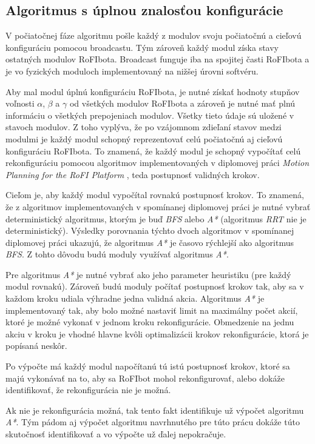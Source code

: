 \documentclass[
  digital, %
  oneside, %
  notable,   %
  lof,     %
  nolot,     %
]{fithesis3}
\begin{document}
\subsection{Algoritmus s úplnou znalosťou konfigurácie}
\label{sec:motionPlanningAlgo}
V počiatočnej fáze algoritmu pošle každý z modulov svoju počiatočnú a cieľovú konfiguráciu pomocou broadcastu. Tým zároveň každý modul získa stavy ostatných modulov RoFIbota. Broadcast funguje iba na spojitej časti RoFIbota a je vo fyzických moduloch implementovaný na nižšej úrovni softvéru.

Aby mal modul úplnú konfiguráciu RoFIbota, je nutné získať hodnoty stupňov voľnosti $\alpha$, $\beta$ a $\gamma$ od všetkých modulov RoFIbota a zároveň je nutné mať plnú informáciu o všetkých prepojeniach modulov. Všetky tieto údaje sú uložené v stavoch modulov. Z toho vyplýva, že po vzájomnom zdieľaní stavov medzi modulmi je každý modul schopný reprezentovať celú počiatočnú aj cieľovú konfiguráciu RoFIbota. To znamená, že každý modul je schopný vypočítať celú rekonfiguráciu pomocou algoritmov implementovaných v diplomovej práci \textit{Motion Planning for the RoFI Platform} \cite{vozarovaMasterThesis}, teda postupnosť validných krokov. 

Cieľom je, aby každý modul vypočítal rovnakú postupnosť krokov. To znamená, že z algoritmov implementovaných v spomínanej diplomovej práci je nutné vybrať deterministický algoritmus, ktorým je buď \textit{BFS} alebo \textit{A*} (algoritmus \textit{RRT} nie je deterministický). Výsledky porovnania týchto dvoch algoritmov v spomínanej diplomovej práci ukazujú, že algoritmus \textit{A*} je časovo rýchlejší ako algoritmus \textit{BFS}. Z tohto dôvodu budú moduly využívať algoritmus \textit{A*}. 

Pre algoritmus \textit{A*} je nutné vybrať ako jeho parameter heuristiku (pre každý modul rovnakú). Zároveň budú moduly počítať postupnosť krokov tak, aby sa v každom kroku udiala výhradne jedna validná akcia. Algoritmus \textit{A*} je implementovaný tak, aby bolo možné nastaviť limit na maximálny počet akcií, ktoré je možné vykonať v jednom kroku rekonfigurácie. Obmedzenie na jednu akciu v kroku je vhodné hlavne kvôli optimalizácii krokov rekonfigurácie, ktorá je popísaná neskôr. 

Po výpočte má každý modul napočítanú tú istú postupnosť krokov, ktoré sa majú vykonávať na to, aby sa RoFIbot mohol rekonfigurovať, alebo dokáže identifikovať, že rekonfigurácia nie je možná. 

Ak nie je rekonfigurácia možná, tak tento fakt identifikuje už výpočet algoritmu \textit{A*}. Tým pádom aj výpočet algoritmu navrhnutého pre túto prácu dokáže túto skutočnosť identifikovať a vo výpočte už ďalej nepokračuje. 
\end{document}
